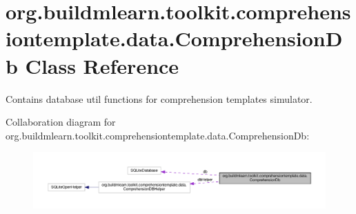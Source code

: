 \hypertarget{classorg_1_1buildmlearn_1_1toolkit_1_1comprehensiontemplate_1_1data_1_1ComprehensionDb}{}\section{org.\+buildmlearn.\+toolkit.\+comprehensiontemplate.\+data.\+Comprehension\+Db Class Reference}
\label{classorg_1_1buildmlearn_1_1toolkit_1_1comprehensiontemplate_1_1data_1_1ComprehensionDb}


Contains database util functions for comprehension template\textquotesingle{}s simulator.  




Collaboration diagram for org.\+buildmlearn.\+toolkit.\+comprehensiontemplate.\+data.\+Comprehension\+Db\+:
\nopagebreak
\begin{figure}[H]
\begin{center}
\leavevmode
\includegraphics[width=350pt]{classorg_1_1buildmlearn_1_1toolkit_1_1comprehensiontemplate_1_1data_1_1ComprehensionDb__coll__graph}
\end{center}
\end{figure}
